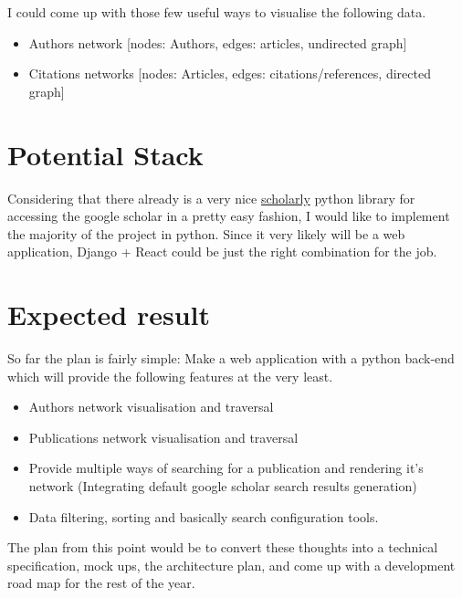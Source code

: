 \documentclass[12pt]{article}
\begin{document}
I could come up with those few useful ways to visualise the following data.
\begin{itemize}
\item Authors network [nodes: Authors, edges: articles, undirected graph]
\item Citations networks [nodes: Articles, edges: citations/references, directed graph]
\end{itemize}

\section{Potential Stack}

Considering that there already is a very nice \href{https://scholarly.readthedocs.io/en/latest/index.html}{scholarly} python library
for accessing the google scholar in a pretty easy fashion, I would like to implement the
majority of the project in python. Since it very likely will be a web application,
Django + React could be just the right combination for the job.

\section{Expected result}

So far the plan is fairly simple: Make a web application with a python
back-end which will provide the following features at the very least.
\begin{itemize}
\item Authors network visualisation and traversal
\item Publications network visualisation and traversal
\item Provide multiple ways of searching for a publication and rendering it's network
  (Integrating default google scholar search results generation)
\item Data filtering, sorting and basically search configuration tools.
\end{itemize}

The plan from this point would be to convert these thoughts into a technical specification,
mock ups, the architecture plan,
and come up with a development road map for the rest of the year.
\end{document}
